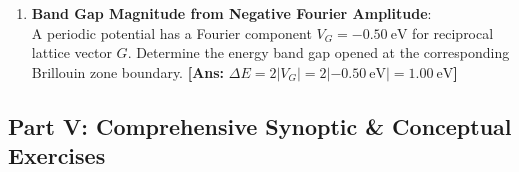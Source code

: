 \documentclass[11pt,a4paper]{article}
\begin{document}
\begin{enumerate}[label=\textbf{\arabic*.}, resume, leftmargin=*]
    \item \textbf{Band Gap Magnitude from Negative Fourier Amplitude}:\\
    A periodic potential has a Fourier component $V_G = -0.50\ \mathrm{eV}$ for reciprocal lattice vector $G$. Determine the energy band gap opened at the corresponding Brillouin zone boundary.
    \textbf{[Ans:} $\Delta E = 2|V_G| = 2|-0.50\ \mathrm{eV}| = 1.00\ \mathrm{eV}$\textbf{]}
\end{enumerate}

\vspace{0.4cm}

\subsection*{Part V: Comprehensive Synoptic \& Conceptual Exercises}
\end{document}
